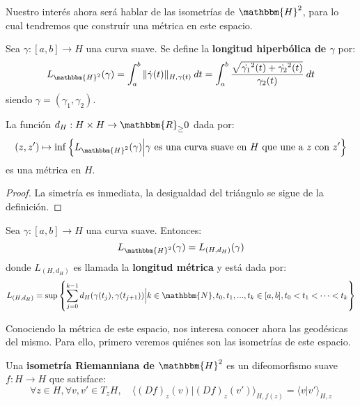 \documentclass[12pt]{report}
\theoremstyle{largebreak}
\newcommand\cf[3]{\ensuremath{#1:#2\rightarrow#3}}
\newcommand{\bbm}[1]{\ensuremath{\mathbbm{#1}}}
\newcommand{\pint}[2]{\langle#1\big|#2 \rangle}
\newcommand{\norm}[1]{\|#1\|}
\begin{document}
    Nuestro interés ahora será hablar de las isometrías de $\bbm{H}^2$, para lo cual tendremos que construír una métrica en este espacio.
    
    \begin{mydef}
        Sea $\cf{\gamma}{[a,b]}{H}$ una curva suave. Se define la \textbf{longitud hiperbólica de $\gamma$} por:
        \begin{equation*}
            L_{\bbm{H}^2}(\gamma)=\int_{a}^{b}\norm{\dot{\gamma}(t)}_{ H,\gamma(t)}\:dt=\int_{a}^{b}\frac{\sqrt{\dot{\gamma_1}^2(t)+\dot{\gamma_2}^2(t)}}{\gamma_2(t)}\:dt
        \end{equation*}
        siendo $\gamma=(\gamma_1,\gamma_2)$.
    \end{mydef}

    \begin{propo}
        La función $\cf{d_H}{H\times H}{\bbm{R}_\geq0}$ dada por:
        \begin{equation*}
            (z,z')\mapsto\inf\left\{L_{\bbm{H}^2}(\gamma)\Big|\gamma\textup{ es una curva suave en $H$ que une a $z$ con $z'$} \right\}
        \end{equation*}
        es una métrica en $H$.
    \end{propo}

    \begin{proof}
        La simetría es inmediata, la desigualdad del triángulo se sigue de la definición.
    \end{proof}

    \begin{propo}
        Sea $\cf{\gamma}{[a,b]}{H}$ una curva suave. Entonces:
        \begin{equation*}
            L_{\bbm{H}^2}(\gamma)=L_{(H,d_H)}(\gamma)
        \end{equation*}
        donde $L_{(H,d_H)}$ es llamada la \textbf{longitud métrica} y está dada por:
        \begin{equation*}
            L_{(H,d_H)}=\sup\left\{\sum_{ j=0}^{k-1}d_H(\gamma(t_j),\gamma(t_{j+1}))\Big|k\in\bbm{N}, t_0,t_1,...,t_k\in[a,b], t_0<t_1<\cdots <t_k \right\}
        \end{equation*}
    \end{propo}

    Conociendo la métrica de este espacio, nos interesa conocer ahora las geodésicas del mismo. Para ello, primero veremos quiénes son las isometrías de este espacio.

    \begin{mydef}
        Una \textbf{isometría Riemanniana de $\bbm{H}^2$} es un difeomorfismo suave $\cf{f}{H}{H}$ que satisface:
        \begin{equation*}
            \forall z\in H, \forall v,v'\in T_zH,\quad\pint{(Df)_z(v)}{(Df)_z(v')}_{H,f(z)}=\pint{v}{v'}_{H,z}
        \end{equation*}
    \end{mydef}
\end{document}
